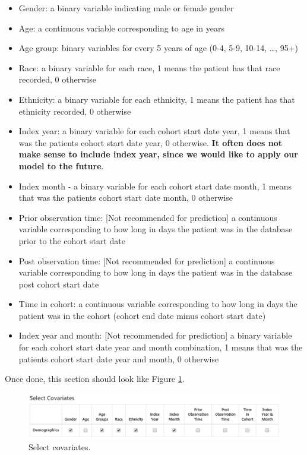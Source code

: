\documentclass[11pt]{book}
\providecommand{\tightlist}{%
  \setlength{\itemsep}{0pt}\setlength{\parskip}{0pt}}
\theoremstyle{definition}
\theoremstyle{definition}
\theoremstyle{definition}
\theoremstyle{remark}
\begin{document}
\begin{itemize}
\tightlist
\item
  Gender: a binary variable indicating male or female gender
\item
  Age: a continuous variable corresponding to age in years
\item
  Age group: binary variables for every 5 years of age (0-4, 5-9, 10-14, \ldots, 95+)
\item
  Race: a binary variable for each race, 1 means the patient has that race recorded, 0 otherwise
\item
  Ethnicity: a binary variable for each ethnicity, 1 means the patient has that ethnicity recorded, 0 otherwise
\item
  Index year: a binary variable for each cohort start date year, 1 means that was the patients cohort start date year, 0 otherwise. \textbf{It often does not make sense to include index year, since we would like to apply our model to the future}.
\item
  Index month - a binary variable for each cohort start date month, 1 means that was the patients cohort start date month, 0 otherwise
\item
  Prior observation time: {[}Not recommended for prediction{]} a continuous variable corresponding to how long in days the patient was in the database prior to the cohort start date
\item
  Post observation time: {[}Not recommended for prediction{]} a continuous variable corresponding to how long in days the patient was in the database post cohort start date
\item
  Time in cohort: a continuous variable corresponding to how long in days the patient was in the cohort (cohort end date minus cohort start date)
\item
  Index year and month: {[}Not recommended for prediction{]} a binary variable for each cohort start date year and month combination, 1 means that was the patients cohort start date year and month, 0 otherwise
\end{itemize}

Once done, this section should look like Figure \ref{fig:covariateSettings2}.

\begin{figure}

{\centering \includegraphics[width=1\linewidth]{images/PatientLevelPrediction/covariateSettings2} 

}

\caption{Select covariates.}\label{fig:covariateSettings2}
\end{figure}
\end{document}
